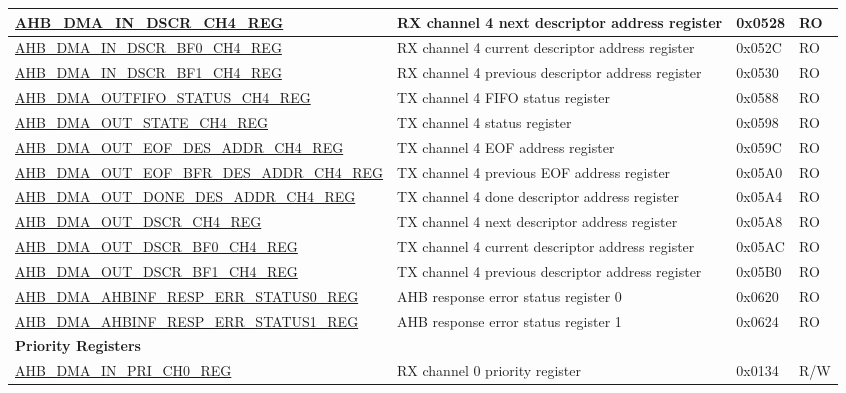 \begin{longtable}{ | l | p{10cm} | p{1.3cm} | l | }
\hyperref[regdesc:AHBDMAINDSCRCHNREG]{AHB\_DMA\_IN\_DSCR\_CH4\_REG} & RX channel 4 next descriptor address register & 0x0528 & RO \\ \hline
\hyperref[regdesc:AHBDMAINDSCRBF0CHNREG]{AHB\_DMA\_IN\_DSCR\_BF0\_CH4\_REG} & RX channel 4 current descriptor address register & 0x052C & RO \\ \hline
\hyperref[regdesc:AHBDMAINDSCRBF1CHNREG]{AHB\_DMA\_IN\_DSCR\_BF1\_CH4\_REG} & RX channel 4 previous descriptor address register & 0x0530 & RO \\ \hline
\hyperref[regdesc:AHBDMAOUTFIFOSTATUSCHNREG]{AHB\_DMA\_OUTFIFO\_STATUS\_CH4\_REG} & TX channel 4 FIFO status register & 0x0588 & RO \\ \hline
\hyperref[regdesc:AHBDMAOUTSTATECHNREG]{AHB\_DMA\_OUT\_STATE\_CH4\_REG} & TX channel 4 status register & 0x0598 & RO \\ \hline
\hyperref[regdesc:AHBDMAOUTEOFDESADDRCHNREG]{AHB\_DMA\_OUT\_EOF\_DES\_ADDR\_CH4\_REG} & TX channel 4 EOF address register & 0x059C & RO \\ \hline
\hyperref[regdesc:AHBDMAOUTEOFBFRDESADDRCHNREG]{AHB\_DMA\_OUT\_EOF\_BFR\_DES\_ADDR\_CH4\_REG} & TX channel 4 previous EOF address register & 0x05A0 & RO \\ \hline
\hyperref[regdesc:AHBDMAOUTDONEDESADDRCHNREG]{AHB\_DMA\_OUT\_DONE\_DES\_ADDR\_CH4\_REG} & TX channel 4 done descriptor address register & 0x05A4 & RO \\ \hline
\hyperref[regdesc:AHBDMAOUTDSCRCHNREG]{AHB\_DMA\_OUT\_DSCR\_CH4\_REG} & TX channel 4 next descriptor address register & 0x05A8 & RO \\ \hline
\hyperref[regdesc:AHBDMAOUTDSCRBF0CHNREG]{AHB\_DMA\_OUT\_DSCR\_BF0\_CH4\_REG} & TX channel 4 current descriptor address register & 0x05AC & RO \\ \hline
\hyperref[regdesc:AHBDMAOUTDSCRBF1CHNREG]{AHB\_DMA\_OUT\_DSCR\_BF1\_CH4\_REG} & TX channel 4 previous descriptor address register & 0x05B0 & RO \\ \hline
\hyperref[regdesc:AHBDMAAHBINFRESPERRSTATUS0REG]{AHB\_DMA\_AHBINF\_RESP\_ERR\_STATUS0\_REG} & AHB response error status register 0 & 0x0620 & RO \\ \hline
\hyperref[regdesc:AHBDMAAHBINFRESPERRSTATUS1REG]{AHB\_DMA\_AHBINF\_RESP\_ERR\_STATUS1\_REG} & AHB response error status register 1 & 0x0624 & RO \\ \hline
\multicolumn{4}{|l|}{\textbf{Priority Registers}} \\ \hline
\hyperref[regdesc:AHBDMAINPRICHNREG]{AHB\_DMA\_IN\_PRI\_CH0\_REG} & RX channel 0 priority register & 0x0134 & R/W \\ \hline

\end{longtable}
